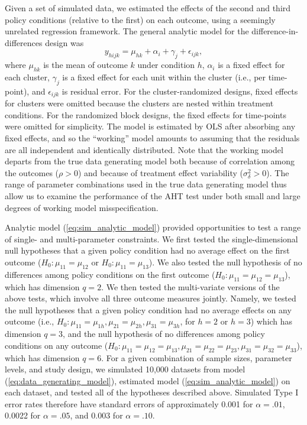 \documentclass[12pt]{article}\usepackage[]{graphicx}\usepackage[]{color}
\begin{document}
Given a set of simulated data, we estimated the effects of the second and third policy conditions (relative to the first) on each outcome, using a seemingly unrelated regression framework. 
The general analytic model for the difference-in-differences design was
\begin{equation}
\label{eq:sim_analytic_model}
y_{hijk} = \mu_{hk} + \alpha_i + \gamma_j + \epsilon_{ijk},
\end{equation}
where $\mu_{hk}$ is the mean of outcome $k$ under condition $h$, $\alpha_i$ is a fixed effect for each cluster, $\gamma_j$ is a fixed effect for each unit within the cluster (i.e., per time-point), and $\epsilon_{ijk}$ is residual error. 
For the cluster-randomized designs, fixed effects for clusters were omitted because the clusters are nested within treatment conditions. For the randomized block designs, the fixed effects for time-points were omitted for simplicity.
The model is estimated by OLS after absorbing any fixed effects, and so the ``working'' model amounts to assuming that the residuals are all independent and identically distributed. Note that the working model departs from the true data generating model both because of correlation among the outcomes ($\rho > 0$) and because of treatment effect variability ($\sigma_\delta^2 > 0$). The range of parameter combinations used in the true data generating model thus allow us to examine the performance of the AHT test under both small and large degrees of working model misspecification. 

Analytic model (\ref{eq:sim_analytic_model}) provided opportunities to test a range of single- and multi-parameter constraints. 
We first tested the single-dimensional null hypotheses that a given policy condition had no average effect on the first outcome ($H_0: \mu_{11} = \mu_{12}$ or $H_0: \mu_{11} = \mu_{13}$). 
We also tested the null hypothesis of no differences among policy conditions on the first outcome ($H_0: \mu_{11} = \mu_{12} = \mu_{13}$), which has dimension $q = 2$. 
We then tested the multi-variate versions of the above tests, which involve all three outcome measures jointly. Namely, we tested the null hypotheses that a given policy condition had no average effects on any outcome (i.e., $H_0: \mu_{11} = \mu_{1h}, \mu_{21} = \mu_{2h}, \mu_{31} = \mu_{3h}$, for $h = 2$ or $h = 3$) which has dimension $q = 3$, and the null hypothesis of no differences among policy conditions on any outcome ($H_0: \mu_{11} = \mu_{12} = \mu_{13}, \mu_{21} = \mu_{22} = \mu_{23}, \mu_{31} = \mu_{32} = \mu_{33}$), which has dimension $q = 6$. 
For a given combination of sample sizes, parameter levels, and study design, we simulated 10,000 datasets from model (\ref{eq:data_generating_model}), estimated model (\ref{eq:sim_analytic_model}) on each dataset, and tested all of the hypotheses described above. 
Simulated Type I error rates therefore have standard errors of approximately 0.001 for $\alpha = .01$, 0.0022 for $\alpha = .05$, and 0.003 for $\alpha = .10$. 
\end{document}

